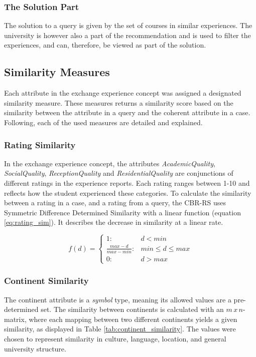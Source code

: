 \subsubsection{The Solution Part}
The solution to a query is given by the set of courses in similar experiences. The university is however also a part of the recommendation and is used to filter the experiences, and can, therefore, be viewed as part of the solution.

\subsection{Similarity Measures}
Each attribute in the exchange experience concept was assigned a designated similarity measure. These measures returns a similarity score based on the similarity between the attribute in a query and the coherent attribute in a case. Following, each of the used measures are detailed and explained.


\subsubsection{Rating Similarity} 

In the exchange experience concept, the attributes \emph{AcademicQuality}, \emph{SocialQuality}, \emph{ReceptionQuality} and \emph{ResidentialQuality} are conjunctions of different ratings in the experience reports. Each rating ranges between 1-10 and reflects how the student experienced these categories. To calculate the similarity between a rating in a case, and a rating from a query, the CBR-RS uses Symmetric Difference Determined Similarity \cite{bergmann2002experience} with a linear function (equation \ref{eq:rating_sim}). It describes the decrease in similarity at a linear rate.


\begin{equation} \label{eq:rating_sim}
    f(d) = 
    \begin{cases} 1 : & d < min \\ 
    \frac{max-d}{max-min} : & min \leq d \leq max \\
    0 : & d > max
    \end{cases}
\end{equation}


\subsubsection{Continent Similarity} 

The continent attribute is a \textit{symbol} type, meaning its allowed values are a pre-determined set. The similarity between continents is calculated with an $m \, x \, n$-matrix, where each mapping between two different continents yields a given similarity, as displayed in Table \ref{tab:continent_similarity}. The values were chosen to represent similarity in culture, language, location, and general university structure.

